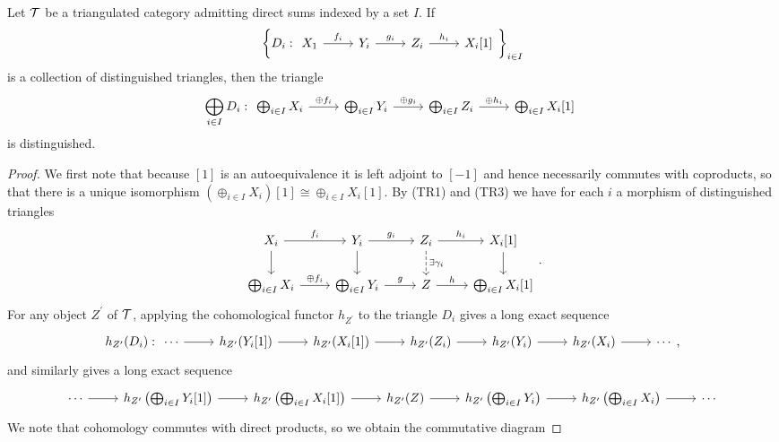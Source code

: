\documentclass[10pt]{amsart}
\begin{document}
\begin{prop}\label{sumtriangles}
  Let $\mathcal{T}$ be a triangulated category admitting direct sums indexed by a set $I$.
  If 
  $$\left\{D_i : \begin{tikzcd}X_1 \arrow{r}{f_i} & Y_i \arrow{r}{g_i} & Z_i\arrow{r}{h_i} & X_i[1]\end{tikzcd}\right\}_{i\in I}$$ 
  is a collection of distinguished triangles, then the triangle 
  $$\bigoplus_{i \in I} D_i : \begin{tikzcd} \bigoplus_{i \in I} X_i \arrow{r}{\oplus f_i} & \bigoplus_{i \in I}Y_i \arrow{r}{\oplus g_i} & \bigoplus_{i \in I} Z_i \arrow{r}{\oplus h_i} & \bigoplus_{i \in I} X_i[1]\end{tikzcd}$$
  is distinguished.

  \begin{proof}
    We first note that because $[1]$ is an autoequivalence it is left adjoint to $[-1]$ and hence necessarily commutes with coproducts, so that there is a unique isomorphism $\left(\oplus_{i \in I}X_i\right)[1] \cong \oplus_{i \in I}X_i[1]$.
    By (TR1) and (TR3) we have for each $i$ a morphism of distinguished triangles
    $$\begin{tikzcd} 
      X_i \arrow{r}{f_i}\arrow{d} & Y_i\arrow{d}\arrow{r}{g_i} & Z_i \arrow[dashed]{d}{\exists \gamma_i}\arrow{r}{h_i} & X_i[1] \arrow{d}\\
      \bigoplus_{i \in I} X_i \arrow{r}{\oplus f_i} & \bigoplus_{i \in I}Y_i \arrow{r}{g} & Z \arrow{r}{h} & \bigoplus_{i \in I} X_i[1]
    \end{tikzcd}.$$
    For any object $Z^\prime$ of $\mathcal{T}$, applying the cohomological functor $h_{Z^\prime}$ to the triangle $D_i$ gives a long exact sequence
    $$h_{Z^\prime}(D_i) : 
    \begin{tikzcd} 
      \cdots \arrow{r} & h_{Z^\prime}(Y_i[1]) \arrow{r} & h_{Z^\prime}(X_i[1]) \arrow{r} & h_{Z^\prime}(Z_i) \arrow{r} & h_{Z^\prime}(Y_i) \arrow{r} & h_{Z^\prime}(X_i) \arrow{r} & \cdots
    \end{tikzcd},$$
    and similarly gives a long exact sequence
    $$\begin{tikzcd}
      \cdots \arrow{r} & h_{Z^\prime}\left(\bigoplus_{i \in I}Y_i[1]\right) \arrow{r} & h_{Z^\prime}\left(\bigoplus_{i \in I}X_i[1]\right) \arrow{r} & h_{Z^\prime}(Z) \arrow{r} & h_{Z^\prime}\left(\bigoplus_{i \in I}Y_i\right) \arrow{r} & h_{Z^\prime}\left(\bigoplus_{i \in I} X_i\right) \arrow{r} & \cdots
    \end{tikzcd}$$
    We note that cohomology commutes with direct products, so we obtain the commutative diagram

\end{proof}
\end{prop}
\end{document}
